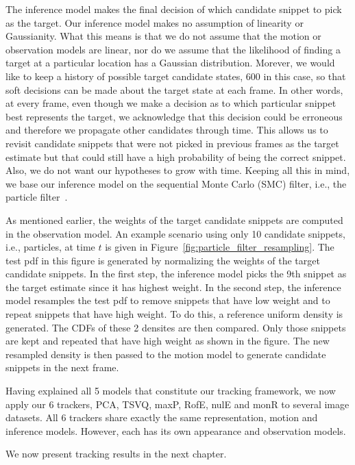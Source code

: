The inference model makes the final decision of which candidate snippet to pick as the target.  Our inference model makes no assumption of linearity or Gaussianity.  What this means is that we do not assume that the motion or observation models are linear, nor do we assume that the likelihood of finding a target at a particular location has a Gaussian distribution.  Morever, we would like to keep a history of possible target candidate states, 600 in this case, so that soft decisions can be made about the target state at each frame.  In other words, at every frame, even though we make a decision as to which particular snippet best represents the target, we acknowledge that this decision could be erroneous and therefore we propagate other candidates through time.  This allows us to revisit candidate snippets that were not picked in previous frames as the target estimate but that could still have a high probability of being the correct snippet.  Also, we do not want our hypotheses to grow with time.  Keeping all this in mind, we base our inference model on the sequential Monte Carlo (SMC) filter, i.e., the particle filter~\cite{2002_JNL_PF_Arulampalam}.  

As mentioned earlier, the weights of the target candidate snippets are computed in the observation model.  An example scenario using only 10 candidate snippets, i.e., particles, at time $t$ is given in Figure~\ref{fig:particle_filter_resampling}.  The test pdf in this figure is generated by normalizing the weights of the target candidate snippets.  In the first step, the inference model picks the 9th snippet as the target estimate since it has highest weight.  In the second step, the inference model resamples the test pdf to remove snippets that have low weight and to repeat snippets that have high weight.  To do this, a reference uniform density is generated.  The CDFs of these 2 densites are then compared.  Only those snippets are kept and repeated that have high weight as shown in the figure.  The new resampled density is then passed to the motion model to generate candidate snippets in the next frame.

Having explained all 5 models that constitute our tracking framework, we now apply our 6 trackers, PCA, TSVQ, maxP, RofE, nulE and monR to several image datasets.  All 6 trackers share exactly the same representation, motion and inference models.  However, each has its own appearance and observation models.  

We now present tracking results in the next chapter.  


